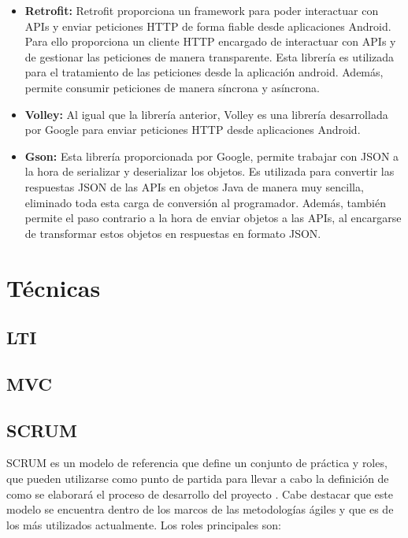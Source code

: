 \begin{itemize}

	\item \textbf{Retrofit:} Retrofit proporciona un framework para poder interactuar con APIs y enviar peticiones HTTP de forma fiable desde aplicaciones Android. Para ello proporciona un cliente HTTP encargado de interactuar con APIs y de gestionar las peticiones de manera transparente.
Esta librería es utilizada para el tratamiento de las peticiones desde la aplicación android. Además, permite consumir peticiones de manera síncrona y asíncrona. \cite{wiki:retrofit}
	
	\item \textbf{Volley:} Al igual que la librería anterior, Volley es una librería desarrollada por Google para enviar peticiones HTTP desde aplicaciones Android. \cite{wiki:volley}
	
	\item \textbf{Gson:} Esta librería proporcionada por Google, permite trabajar con JSON a la hora de serializar y deserializar los objetos. Es utilizada para convertir las respuestas JSON de las APIs en objetos Java de manera muy sencilla, eliminado toda esta carga de conversión al programador. Además, también permite el paso contrario a la hora de enviar objetos a las APIs, al encargarse de transformar estos objetos en respuestas en formato JSON. \cite{wiki:gson}

\end{itemize}

\section{Técnicas}

\subsection{LTI}
\subsection{MVC}
\subsection{SCRUM}\label{scrum} 

SCRUM es un modelo de referencia que define un conjunto de práctica y roles, que pueden utilizarse como punto de partida para llevar a cabo la definición de como se elaborará el proceso de desarrollo del proyecto \cite{wiki:scrum}. Cabe destacar que este modelo se encuentra dentro de los marcos de las metodologías ágiles y que es de los más utilizados actualmente.
Los roles principales son:

